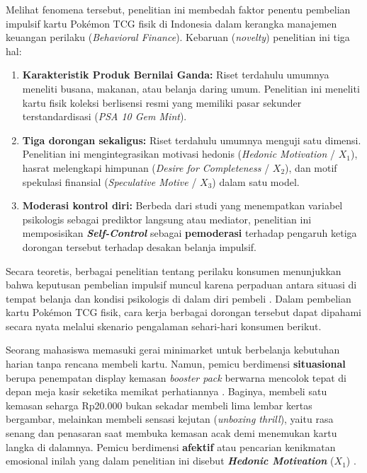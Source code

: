 \documentclass[12pt,a4paper]{article}
\numberwithin{equation}{section}
\numberwithin{table}{section}
\numberwithin{figure}{section}
\begin{document}
Melihat fenomena tersebut, penelitian ini membedah faktor penentu pembelian impulsif kartu Pok\'emon TCG fisik di Indonesia dalam kerangka manajemen keuangan perilaku (\emph{Behavioral Finance}). Kebaruan (\emph{novelty}) penelitian ini tiga hal:
\begin{enumerate}
  \item \textbf{Karakteristik Produk Bernilai Ganda:} Riset terdahulu umumnya meneliti busana, makanan, atau belanja daring umum. Penelitian ini meneliti kartu fisik koleksi berlisensi resmi yang memiliki pasar sekunder terstandardisasi (\emph{PSA 10 Gem Mint}).
  \item \textbf{Tiga dorongan sekaligus:} Riset terdahulu umumnya menguji satu dimensi. Penelitian ini mengintegrasikan motivasi hedonis (\emph{Hedonic Motivation} / $X_1$), hasrat melengkapi himpunan (\emph{Desire for Completeness} / $X_2$), dan motif spekulasi finansial (\emph{Speculative Motive} / $X_3$) dalam satu model.
  \item \textbf{Moderasi kontrol diri:} Berbeda dari studi yang menempatkan variabel psikologis sebagai prediktor langsung atau mediator, penelitian ini memposisikan \textbf{\emph{Self-Control}} sebagai \textbf{pemoderasi} terhadap pengaruh ketiga dorongan tersebut terhadap desakan belanja impulsif.
\end{enumerate}

Secara teoretis, berbagai penelitian tentang perilaku konsumen menunjukkan bahwa keputusan pembelian impulsif muncul karena perpaduan antara situasi di tempat belanja dan kondisi psikologis di dalam diri pembeli \citep{nyrhinen2024online, iyer2020impulse, lubis2022evaluation}. Dalam pembelian kartu Pok\'emon TCG fisik, cara kerja berbagai dorongan tersebut dapat dipahami secara nyata melalui skenario pengalaman sehari-hari konsumen berikut.

Seorang mahasiswa memasuki gerai minimarket untuk berbelanja kebutuhan harian tanpa rencana membeli kartu. Namun, pemicu berdimensi \textbf{situasional} berupa penempatan display kemasan \emph{booster pack} berwarna mencolok tepat di depan meja kasir seketika memikat perhatiannya \citep{qu2023impulse}. Baginya, membeli satu kemasan seharga Rp20.000 bukan sekadar membeli lima lembar kertas bergambar, melainkan membeli sensasi kejutan (\emph{unboxing thrill}), yaitu rasa senang dan penasaran saat membuka kemasan acak demi menemukan kartu langka di dalamnya. Pemicu berdimensi \textbf{afektif} atau pencarian kenikmatan emosional inilah yang dalam penelitian ini disebut \textbf{\emph{Hedonic Motivation}} ($X_1$) \citep{arnold2003hedonic, mariyana2023influence, babin1994work}.
\end{document}
